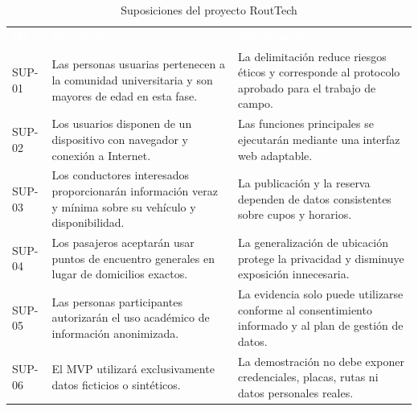 \documentclass[12pt,a4paper]{article}
\begin{document}
\begin{table}[H]
\centering
\caption{Suposiciones del proyecto RoutTech}
\label{tab:suposiciones}
\small
{}
\begin{tabularx}{\textwidth}{C{1.35cm} Y Y}
\textcolor{white}{\textbf{ID}} &
\textcolor{white}{\textbf{Suposición}} &
\textcolor{white}{\textbf{Justificación}}\\
SUP-01 & Las personas usuarias pertenecen a la comunidad universitaria y son mayores de edad en esta fase. & La delimitación reduce riesgos éticos y corresponde al protocolo aprobado para el trabajo de campo.\\
SUP-02 & Los usuarios disponen de un dispositivo con navegador y conexión a Internet. & Las funciones principales se ejecutarán mediante una interfaz web adaptable.\\
SUP-03 & Los conductores interesados proporcionarán información veraz y mínima sobre su vehículo y disponibilidad. & La publicación y la reserva dependen de datos consistentes sobre cupos y horarios.\\
SUP-04 & Los pasajeros aceptarán usar puntos de encuentro generales en lugar de domicilios exactos. & La generalización de ubicación protege la privacidad y disminuye exposición innecesaria.\\
SUP-05 & Las personas participantes autorizarán el uso académico de información anonimizada. & La evidencia solo puede utilizarse conforme al consentimiento informado y al plan de gestión de datos.\\
SUP-06 & El MVP utilizará exclusivamente datos ficticios o sintéticos. & La demostración no debe exponer credenciales, placas, rutas ni datos personales reales.\\
\end{tabularx}
\end{table}
\end{document}

